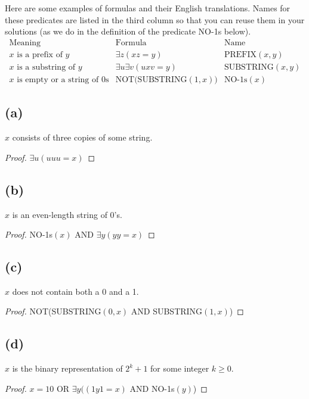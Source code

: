 \documentclass[14pt]{extarticle}
\begin{document}
Here are some examples of formulas and their English translations. Names for these predicates are listed in the third column so that you can reuse them in your solutions (as we do in the definition of the predicate NO-1s below).
$$
    \begin{array}{|l|c|l|}
        \text{Meaning}                                & \text{Formula}               & \text{Name}            \\
        \hline
        x \text{ is a prefix of } y                   & \exists z(xz = y)            & \text{PREFIX}(x, y)    \\
        x \text{ is a substring of } y                & \exists u \exists v(uxv = y) & \text{SUBSTRING}(x, y) \\
        x \text{ is empty or a string of } 0 \text{s} & \text{NOT(SUBSTRING}(1,x))   & \text{NO-1s}(x)
    \end{array}
$$

\subsection{(a)}
$x$ consists of three copies of some string.
\begin{proof}
    $\exists u (uuu = x)$
\end{proof}

\subsection{(b)}
$x$ is an even-length string of 0’s.
\begin{proof}
    NO-1s$(x)$ AND $\exists y (yy = x)$
\end{proof}

\subsection{(c)}
$x$ does not contain both a 0 and a 1.
\begin{proof}
    NOT(SUBSTRING$(0,x)$ AND SUBSTRING$(1, x)$)
\end{proof}

\subsection{(d)}
$x$ is the binary representation of $2^k + 1$ for some integer $k \geq 0$.
\begin{proof}
    $x = 10 \text{ OR }\exists y ((1y1 = x)$ AND NO-1s$(y)$)
\end{proof}
\end{document}

